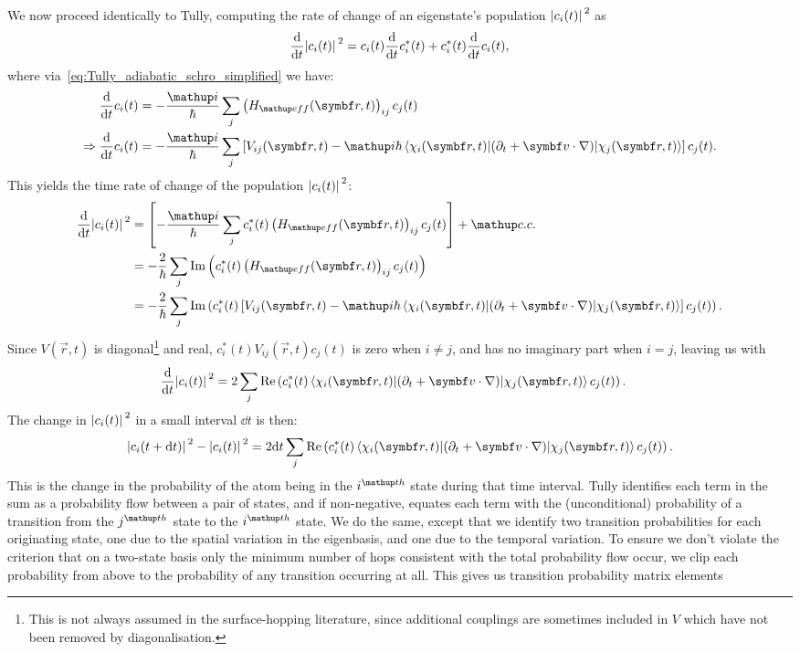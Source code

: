 We now proceed identically to Tully, computing the rate of change of an eigenstate's population $\abs{c_i(t)}^2$ as
\begin{align}
\dv{t}\abs{c_i(t)}^2 = c_i(t) \dv{t}c_i^*(t) + c_i^*(t) \dv{t}c_i(t),
\end{align}
where via~\eqref{eq:Tully_adiabatic_schro_simplified} we have:
\begin{align}
\dv{t}c_i(t) &= -\frac\ii\hbar\sum_j \left(H_\up{eff}(\vec r, t)\right)_{ij} c_j(t)\\
\Rightarrow \dv{t}c_i(t) &= -\frac\ii\hbar \sum_j\left[V_{ij}(\vec r, t)
  - \ii\hbar\matrixel{\chi_i(\vec r, t)}{(\partial_t + \vec v\cdot\nabla)}{\chi_j(\vec r, t)}
 \right] c_j(t).
\end{align}
This yields the time rate of change of the population $\abs{c_i(t)}^2$:
\begin{align}
\dv{t}\abs{c_i(t)}^2 &= \left[-\frac\ii\hbar \sum_j c_i^*(t) \left(H_\up{eff}(\vec r, t)\right)_{ij} c_j(t)\right] + \up{c.c.}\\
&= -\frac2\hbar\sum_j\im\left(c_i^*(t) \left(H_\up{eff}(\vec r, t)\right)_{ij} c_j(t)\right)\label{eq:fewest_switches_Heff}\\
&= -\frac2\hbar\sum_j\im\left(c_i^*(t)
\left[V_{ij}(\vec r, t)
  - \ii\hbar\matrixel{\chi_i(\vec r, t)}{(\partial_t + \vec v\cdot\nabla)}{\chi_j(\vec r, t)}
 \right]
 c_j(t)\right).
\end{align}
Since $V(\vec r, t)$ is diagonal\footnote{This is not always assumed in the surface-hopping literature, since additional couplings are sometimes included in $V$ which have not been removed by diagonalisation.} and real, $c_i^*(t)V_{ij}(\vec r, t)c_j(t)$ is zero when $i\neq j$, and has no imaginary part when $i=j$, leaving us with
\begin{align}
\dv{t}\abs{c_i(t)}^2 &= 2\sum_j\re\left(c_i^*(t)
  \matrixel{\chi_i(\vec r, t)}{(\partial_t + \vec v\cdot\nabla)}{\chi_j(\vec r, t)}
 c_j(t)\right).
\end{align}
The change in $\abs{c_i(t)}^2$ in a small interval $\dd t$ is then:
\begin{align}\label{eq:Tully_change_in_prob}
\abs{c_i(t + \dd t)}^2 - \abs{c_i(t)}^2 = 2\dd t
\sum_j\re\left(c_i^*(t)
  \matrixel{\chi_i(\vec r, t)}{(\partial_t + \vec v\cdot\nabla)}{\chi_j(\vec r, t)}
 c_j(t)\right).
\end{align}
This is the change in the probability of the atom being in the $i^\up{th}$ state during that time interval. Tully identifies each term in the sum as a probability flow between a pair of states, and if non-negative, equates each term with the (unconditional) probability of a transition from the $j^\up{th}$ state to the $i^\up{th}$ state. We do the same, except that we identify two transition probabilities for each originating state, one due to the spatial variation in the eigenbasis, and one due to the temporal variation. To ensure we don't violate the criterion that on a two-state basis only the minimum number of hops consistent with the total probability flow occur, we clip each probability from above to the probability of any transition occurring at all. This gives us transition probability matrix elements
